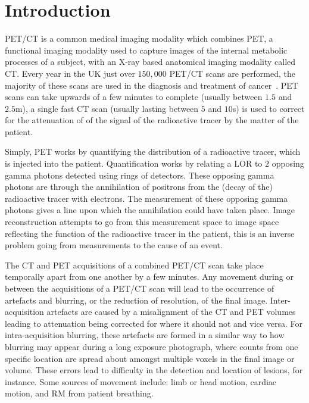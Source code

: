 \chapter{Introduction} \label{sec:introduction}
    
    
        \gls{PET}/\gls{CT} is a common medical imaging modality which combines \gls{PET}, a functional imaging modality used to capture images of the internal metabolic processes of a subject, with an X-ray based anatomical imaging modality called \gls{CT}. Every year in the UK just over $150,000$ \gls{PET}/\gls{CT} scans are performed, the majority of these scans are used in the diagnosis and treatment of cancer~. \gls{PET} scans can take upwards of a few minutes to complete (usually between $1.5$ and $2.5$m), a single fast \gls{CT} scan (usually lasting between $5$ and $10$s) is used to correct for the attenuation of of the signal of the radioactive tracer by the matter of the patient.
        
        Simply, \gls{PET} works by quantifying the distribution of a radioactive tracer, which is injected into the patient. Quantification works by relating a \gls{LOR} to $2$ opposing gamma photons detected using rings of detectors. These opposing gamma photons are through the annihilation of positrons from the (decay of the) radioactive tracer with electrons. The measurement of these opposing gamma photons gives a line upon which the annihilation could have taken place. Image reconstruction attempts to go from this measurement space to image space reflecting the function of the radioactive tracer in the patient, this is an inverse problem going from measurements to the cause of an event.
        
        The \gls{CT} and \gls{PET} acquisitions of a combined \gls{PET}/\gls{CT} scan take place temporally apart from one another by a few minutes. Any movement during or between the acquisitions of a \gls{PET}/\gls{CT} scan will lead to the occurrence of artefacts and blurring, or the reduction of resolution, of the final image. Inter-acquisition artefacts are caused by a misalignment of the \gls{CT} and \gls{PET} volumes leading to attenuation being corrected for where it should not and vice versa. For intra-acquisition blurring, these artefacts are formed in a similar way to how blurring may appear during a long exposure photograph, where counts from one specific location are spread about amongst multiple voxels in the final image or volume. These errors lead to difficulty in the detection and location of lesions, for instance. Some sources of movement include: limb or head motion, cardiac motion, and \gls{RM} from patient breathing.
        
